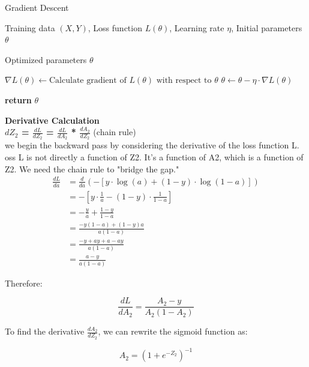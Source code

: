\documentclass{article}
\begin{document}
\begin{algorithm}
\caption{Gradient Descent}
\label{alg:gradient_descent}
\begin{algorithmic}[1] %

\Require Training data $(X, Y)$, Loss function $L(\theta)$, Learning rate $\eta$, Initial parameters $\theta$

\Ensure Optimized parameters $\theta$

    \State $\nabla L(\theta) \gets \text{Calculate gradient of } L(\theta) \text{ with respect to } \theta$ 
    \State $\theta \gets \theta - \eta \cdot \nabla L(\theta)$ 
\EndWhile

\State \textbf{return} $\theta$

\end{algorithmic}
\end{algorithm}

\textbf{Derivative Calculation} \\
\textbf{${dZ_2}$ = $\frac{dL}{dZ_2}$  = $\frac{dL}{dA_2}$ * $\frac{dA_2}{dZ_2}$} (chain rule) \\
we begin the backward pass by considering the derivative of the loss function L. oss L is not directly a function of Z2. It's a function of A2, which is a function of Z2. We need the chain rule to "bridge the gap."
\begin{align}
\frac{dL}{da} &= \frac{d}{da} \left( -[y \cdot \log(a) + (1-y) \cdot \log(1-a)] \right) \\
&= -\left[ y \cdot \frac{1}{a} - (1-y) \cdot \frac{1}{1-a} \right] \\
&= -\frac{y}{a} + \frac{1-y}{1-a} \\
&= \frac{-y(1-a) + (1-y)a}{a(1-a)} \\
&= \frac{-y + ay + a - ay}{a(1-a)} \\
&= \frac{a - y}{a(1-a)}
\end{align}

Therefore:

\begin{equation}
\frac{dL}{dA_2} = \frac{A_2 - y}{A_2(1-A_2)}
\end{equation}

To find the derivative $\frac{dA_2}{dZ_2}$, we can rewrite the sigmoid function as:

\begin{equation}
A_2 = (1 + e^{-Z_2})^{-1}
\end{equation}
\end{document}
